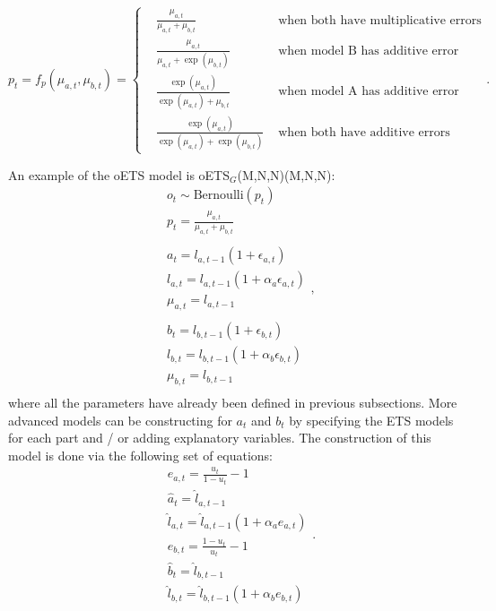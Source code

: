 \documentclass[
]{book}
\theoremstyle{definition}
\theoremstyle{definition}
\theoremstyle{definition}
\theoremstyle{definition}
\theoremstyle{remark}
\begin{document}
\begin{equation}
    p_t = f_p(\mu_{a,t}, \mu_{b,t}) = \left \lbrace
    \begin{aligned}
        & \frac{\mu_{a,t}}{\mu_{a,t} + \mu_{b,t}} & \text{ when both have multiplicative errors} \\
        & \frac{\mu_{a,t}}{\mu_{a,t} + \exp(\mu_{b,t})} & \text{ when model B has additive error} \\
        & \frac{\exp(\mu_{a,t})}{\exp(\mu_{a,t}) + \mu_{b,t}} & \text{ when model A has additive error} \\
        & \frac{\exp(\mu_{a,t})}{\exp(\mu_{a,t}) + \exp(\mu_{b,t})} & \text{ when both have additive errors}
    \end{aligned} .
    \right.
  \label{eq:probabilityFunction}
\end{equation}

An example of the oETS model is oETS\(_G\)(M,N,N)(M,N,N):
\begin{equation}
    \begin{aligned}
        & o_t \sim \text{Bernoulli} \left(p_t \right) \\
        & p_t = \frac{\mu_{a,t}}{\mu_{a,t}+\mu_{b,t}} \\
        \\
        & a_t = l_{a,t-1} \left(1 + \epsilon_{a,t} \right) \\
        & l_{a,t} = l_{a,t-1}( 1  + \alpha_{a} \epsilon_{a,t}) \\
        & \mu_{a,t} = l_{a,t-1} \\
        \\
        & b_t = l_{b,t-1} \left(1 + \epsilon_{b,t} \right) \\
        & l_{b,t} = l_{b,t-1}( 1  + \alpha_{b} \epsilon_{b,t}) \\
        & \mu_{b,t} = l_{b,t-1} \\
    \end{aligned},
  \label{eq:oETSGExample}
\end{equation}
where all the parameters have already been defined in previous subsections. More advanced models can be constructing for \(a_t\) and \(b_t\) by specifying the ETS models for each part and / or adding explanatory variables. The construction of this model is done via the following set of equations:
\begin{equation}
    \begin{aligned}
        & e_{a,t} = \frac{u_t}{1-u_t} -1 \\
        & \hat{a}_t = \hat{l}_{a,t-1} \\
        & \hat{l}_{a,t} = \hat{l}_{a,t-1}( 1  + \alpha_{a} e_{a,t}) \\
        & e_{b,t} = \frac{1-u_t}{u_t} -1 \\
        & \hat{b}_t = \hat{l}_{b,t-1} \\
        & \hat{l}_{b,t} = \hat{l}_{b,t-1}( 1  + \alpha_{b} e_{b,t})
    \end{aligned} .
  \label{eq:oETSGExampleEstimated}
\end{equation}
\end{document}
